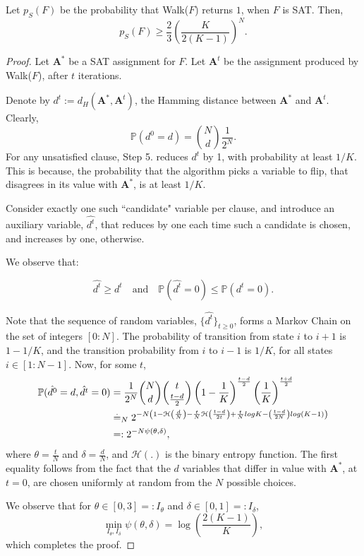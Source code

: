 \documentclass[letterpaper,english,11pt]{article}
\begin{document}
\begin{prop}
Let $p_S(F)$ be the probability that Walk($F$) returns $1$, when $F$ is SAT. Then,
\begin{equation*}
    p_S(F)\geq \frac{2}{3}\left(\frac{K}{2(K-1)}\right)^{N}.
\end{equation*}
\end{prop}
\begin{proof}
Let $\mathbf{A}^{*}$ be a SAT assignment for $F$. Let $\mathbf{A}^{t}$ be the assignment produced by Walk($F$), after $t$ iterations.

Denote by $d^{t}:= d_H(\mathbf{A}^{*},\mathbf{A}^{t})$, the Hamming distance between $\mathbf{A}^{*}$ and $\mathbf{A}^{t}$. Clearly,
\begin{equation*}
    \mathbb{P}(d^0=d)={N\choose d}\frac{1}{2^N}.
\end{equation*}
For any unsatisfied clause, Step 5. reduces $d^{t}$ by 1, with probability at least $1/K$. This is because, the probability that the algorithm picks a variable to flip, that disagrees in its value with $\mathbf{A}^{*}$, is at least $1/K$.

Consider exactly one such ``candidate" variable per clause, and introduce an auxiliary variable, $\hat{d^{t}}$, that reduces by one each time such a candidate is chosen, and increases by one, otherwise.

We observe that:

\begin{equation*}
    \hat{d^{t}}\geq d^{t} \quad \text{and}\quad \mathbb{P}(\hat{d^{t}}=0)\leq \mathbb{P}({d^{t}}=0). 
\end{equation*}

Note that the sequence of random variables, $\{\hat{d^{t}}\}_{t\geq 0}$, forms a Markov Chain on the set of integers $[0:N]$. The probability of transition from state $i$ to $i+1$ is $1-1/K$, and the transition probability from $i$ to $i-1$ is $1/K$, for all states $i\in[1:N-1]$. Now, for some $t$,
\begin{align*}
    \mathbb{P}(\hat{d^{0}}=d,\hat{d^{t}}=0) &= \frac{1}{2^N}{N\choose d}{t\choose \frac{t-d}{2}}\left(1-\frac{1}{K}\right)^{\frac{t-d}{2}}\left(\frac{1}{K}\right)^{\frac{t+d}{2}}\\
    &\stackrel{.}{=}_{\small{N}} 2^{-N\left(1-\mathcal{H}\left(\frac{d}{N}\right)-\frac{t}{N}\mathcal{H}\left(\frac{t-d}{2t}\right)+\frac{t}{N}logK-\left(\frac{t-d}{2N}\right)log(K-1)\right)}\\
    &=: 2^{-N\psi(\theta,\delta)},
\end{align*}
where $\theta=\frac{t}{N}$ and $\delta = \frac{d}{N}$, and $\mathcal{H}(.)$ is the binary entropy function. The first equality follows from the fact that the $d$ variables that differ in value with $\mathbf{A}^{*}$, at $t=0$, are chosen uniformly at random from the $N$ possible choices.

We observe that for $\theta \in [0,3]=:I_{\theta}$ and $\delta \in [0,1]=:I_{\delta}$,
\begin{equation*}
    \min_{I_{\theta}, I_{\delta}}\psi(\theta,\delta) = \log \left(\frac{2(K-1)}{K}\right),
\end{equation*}
which completes the proof.
\end{proof}
\end{document}
